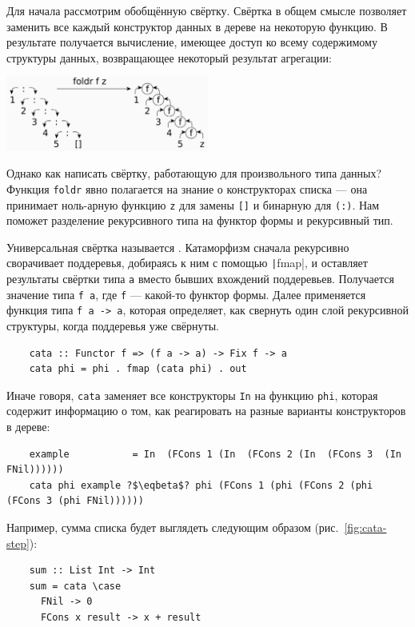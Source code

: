 Для начала рассмотрим обобщённую свёртку.
Свёртка в общем смысле позволяет заменить все каждый конструктор данных в дереве на некоторую функцию.
В результате получается вычисление, имеющее доступ ко всему содержимому структуры данных, возвращающее некоторый результат агрегации:
\begin{center}
    \includegraphics[width=0.5\textwidth]{figs/foldr}
\end{center}

Однако как написать свёртку, работающую для произвольного типа данных?
Функция \texttt{foldr} явно полагается на знание о конструкторах списка --- она принимает ноль-арную функцию \texttt{z} для замены \texttt{[]} и бинарную для \texttt{(:)}.
Нам поможет разделение рекурсивного типа на функтор формы и рекурсивный тип.

Универсальная свёртка называется .
Катаморфизм сначала рекурсивно сворачивает поддеревья, добираясь к ним с помощью \texttt|fmap|, и оставляет результаты свёртки типа \texttt{a} вместо бывших вхождений поддеревьев.
Получается значение типа \texttt{f a}, где \texttt{f} --- какой-то функтор формы.
Далее применяется функция типа \texttt{f a -> a}, которая определяет, как свернуть один слой рекурсивной структуры, когда поддеревья уже свёрнуты.
\begin{verbatim}
    cata :: Functor f => (f a -> a) -> Fix f -> a
    cata phi = phi . fmap (cata phi) . out
\end{verbatim}
Иначе говоря, \texttt{cata} заменяет все конструкторы \texttt{In} на функцию \texttt{phi}, которая содержит информацию о том, как реагировать на разные варианты конструкторов в дереве:
\begin{verbatim}
    example           = In  (FCons 1 (In  (FCons 2 (In  (FCons 3  (In  FNil))))))
    cata phi example ?$\eqbeta$? phi (FCons 1 (phi (FCons 2 (phi (FCons 3 (phi FNil))))))
\end{verbatim}

Например, сумма списка будет выглядеть следующим образом (рис.~\ref{fig:cata-step}):
\begin{verbatim}
    sum :: List Int -> Int
    sum = cata \case
      FNil -> 0
      FCons x result -> x + result
\end{verbatim}


